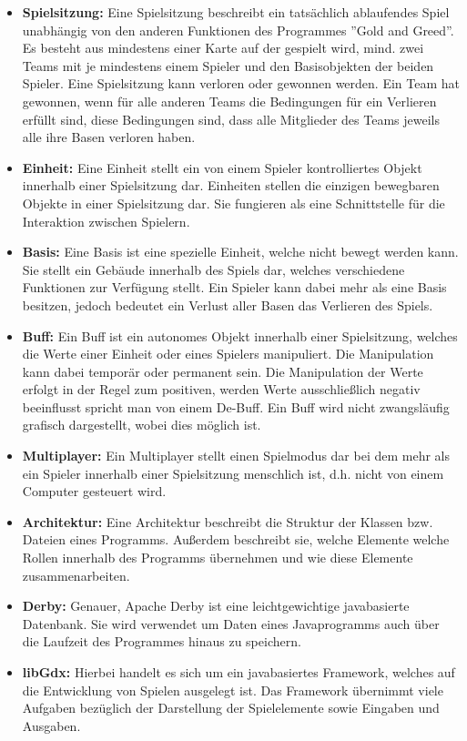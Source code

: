 \documentclass[fontsize=12pt,paper=a4,twoside]{scrartcl}
\begin{document}
\begin{itemize}
\item \textbf{Spielsitzung:} Eine Spielsitzung beschreibt ein tatsächlich ablaufendes Spiel unabhängig von den anderen Funktionen des Programmes ''Gold and Greed''. Es besteht aus mindestens einer Karte auf der gespielt wird, mind. zwei Teams mit je mindestens einem Spieler und den Basisobjekten der beiden Spieler. Eine Spielsitzung kann verloren oder gewonnen werden. Ein Team hat gewonnen, wenn für alle anderen Teams die Bedingungen für ein Verlieren erfüllt sind, diese Bedingungen sind, dass alle Mitglieder des Teams jeweils alle ihre Basen verloren haben.
\item \textbf{Einheit:} Eine Einheit stellt ein von einem Spieler kontrolliertes Objekt innerhalb einer Spielsitzung dar. Einheiten stellen die einzigen bewegbaren Objekte in einer Spielsitzung dar. Sie fungieren als eine Schnittstelle für die Interaktion zwischen Spielern.
\item \textbf{Basis:} Eine Basis ist eine spezielle Einheit, welche nicht bewegt werden kann. Sie stellt ein Gebäude innerhalb des Spiels dar, welches verschiedene Funktionen zur Verfügung stellt. Ein Spieler kann dabei mehr als eine Basis besitzen, jedoch bedeutet ein Verlust aller Basen das Verlieren des Spiels.  
\item \textbf{Buff:} Ein Buff ist ein autonomes Objekt innerhalb einer Spielsitzung, welches die Werte einer Einheit oder eines Spielers manipuliert. Die Manipulation kann dabei temporär oder permanent sein. Die Manipulation der Werte erfolgt in der Regel zum positiven, werden Werte ausschließlich negativ beeinflusst spricht man von einem De-Buff. Ein Buff wird nicht zwangsläufig grafisch dargestellt, wobei dies möglich ist.
\item \textbf{Multiplayer:} Ein Multiplayer stellt einen Spielmodus dar bei dem mehr als ein Spieler innerhalb einer Spielsitzung menschlich ist, d.h. nicht von einem Computer gesteuert wird.
\item \textbf{Architektur:} Eine Architektur beschreibt die Struktur der Klassen bzw. Dateien eines Programms. Außerdem beschreibt sie, welche Elemente welche Rollen innerhalb des Programms übernehmen und wie diese Elemente zusammenarbeiten.
\item \textbf{Derby:} Genauer, Apache Derby ist eine leichtgewichtige javabasierte Datenbank. Sie wird verwendet um Daten eines Javaprogramms auch über die Laufzeit des Programmes hinaus zu speichern.
\item \textbf{libGdx:} Hierbei handelt es sich um ein javabasiertes Framework, welches auf die Entwicklung von Spielen ausgelegt ist. Das Framework übernimmt viele Aufgaben bezüglich der Darstellung der Spielelemente sowie Eingaben und Ausgaben.

\end{itemize}
\end{document}

